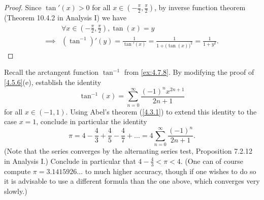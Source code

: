 \begin{proof}
  Since \(\tan'(x) > 0\) for all \(x \in (-\frac{\pi}{2}, \frac{\pi}{2})\), by inverse function theorem (Theorem 10.4.2 in Analysis I) we have
  \begin{align*}
             & \forall x \in (-\frac{\pi}{2}, \frac{\pi}{2}), \tan(x) = y                                    \\
    \implies & (\tan^{-1})'(y) = \frac{1}{\tan'(x)} = \frac{1}{1 + \big(\tan(x)\big)^2} = \frac{1}{1 + y^2}.
  \end{align*}
\end{proof}

\begin{ex}\label{ex:4.7.9}
  Recall the arctangent function \(\tan^{-1}\) from \cref{ex:4.7.8}.
  By modifying the proof of \cref{4.5.6}(e), establish the identity
  \[
    \tan^{-1}(x) = \sum_{n = 0}^\infty \frac{(-1)^n x^{2n + 1}}{2n + 1}
  \]
  for all \(x \in (-1, 1)\).
  Using Abel's theorem (\cref{4.3.1}) to extend this identity to the case \(x = 1\), conclude in particular the identity
  \[
    \pi = 4 - \frac{4}{3} + \frac{4}{5} - \frac{4}{7} + \dots = 4 \sum_{n = 0}^\infty \frac{(-1)^n}{2n + 1}.
  \]
  (Note that the series converges by the alternating series test, Proposition 7.2.12 in Analysis I.)
  Conclude in particular that \(4 - \frac{4}{3} < \pi < 4\).
  (One can of course compute \(\pi = 3.1415926 \dots\) to much higher accuracy, though if one wishes to do so it is advisable to use a different formula than the one above, which converges very slowly.)
\end{ex}

